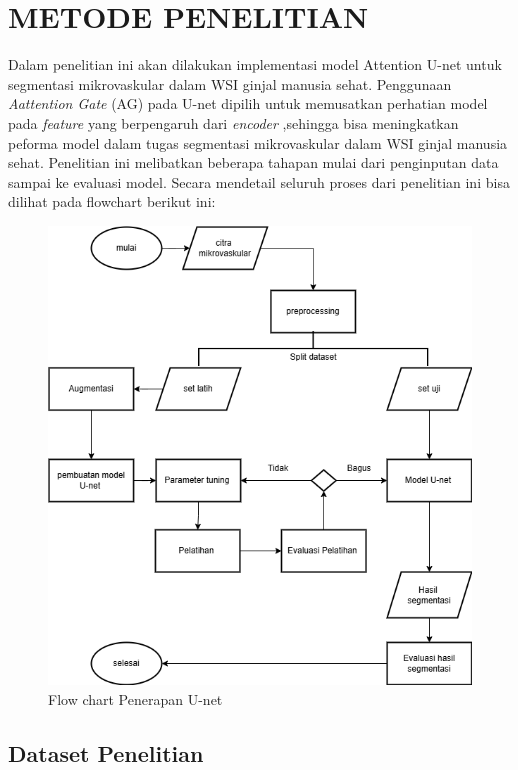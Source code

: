 \chapter{METODE PENELITIAN}
\label{sec:metode-penelitian}

\noindent Dalam penelitian ini akan dilakukan implementasi model Attention U-net untuk segmentasi mikrovaskular dalam WSI ginjal manusia sehat.  Penggunaan \textit{Aattention Gate} (AG) pada U-net dipilih untuk memusatkan perhatian model pada \textit{feature} yang berpengaruh dari \textit{encoder} ,sehingga bisa meningkatkan peforma model dalam tugas segmentasi mikrovaskular dalam WSI ginjal manusia sehat. Penelitian ini melibatkan beberapa tahapan mulai dari penginputan data sampai ke evaluasi model. Secara mendetail seluruh proses dari penelitian ini bisa dilihat pada flowchart berikut ini:
\begin{figure}[H]
	\centering
	\includegraphics[scale=.6]{gambar/flow-chart.png}
	\caption{Flow chart Penerapan U-net}
	\label{fig:flow-chart}
\end{figure}

\section{Dataset Penelitian}

